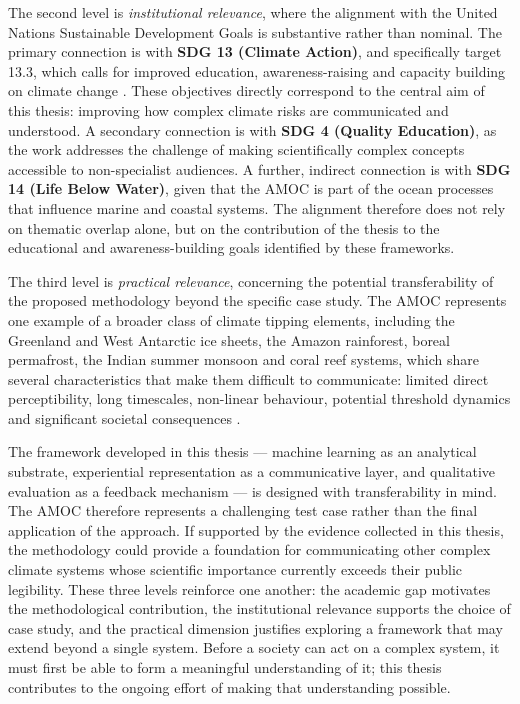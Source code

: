 The second level is \emph{institutional relevance}, where the alignment with the United Nations Sustainable Development Goals is substantive rather than nominal. The primary connection is with \textbf{SDG 13 (Climate Action)}, and specifically target 13.3, which calls for improved education, awareness-raising and capacity building on climate change \citep{un2015}. These objectives directly correspond to the central aim of this thesis: improving how complex climate risks are communicated and understood. A secondary connection is with \textbf{SDG 4 (Quality Education)}, as the work addresses the challenge of making scientifically complex concepts accessible to non-specialist audiences. A further, indirect connection is with \textbf{SDG 14 (Life Below Water)}, given that the AMOC is part of the ocean processes that influence marine and coastal systems. The alignment therefore does not rely on thematic overlap alone, but on the contribution of the thesis to the educational and awareness-building goals identified by these frameworks.

The third level is \emph{practical relevance}, concerning the potential transferability of the proposed methodology beyond the specific case study. The AMOC represents one example of a broader class of climate tipping elements, including the Greenland and West Antarctic ice sheets, the Amazon rainforest, boreal permafrost, the Indian summer monsoon and coral reef systems, which share several characteristics that make them difficult to communicate: limited direct perceptibility, long timescales, non-linear behaviour, potential threshold dynamics and significant societal consequences \citep{armstrongmckay2022, lenton2008}. 

The framework developed in this thesis — machine learning as an analytical substrate, experiential representation as a communicative layer, and qualitative evaluation as a feedback mechanism — is designed with transferability in mind. The AMOC therefore represents a challenging test case rather than the final application of the approach. If supported by the evidence collected in this thesis, the methodology could provide a foundation for communicating other complex climate systems whose scientific importance currently exceeds their public legibility. These three levels reinforce one another: the academic gap motivates the methodological contribution, the institutional relevance supports the choice of case study, and the practical dimension justifies exploring a framework that may extend beyond a single system. Before a society can act on a complex system, it must first be able to form a meaningful understanding of it; this thesis contributes to the ongoing effort of making that understanding possible.

